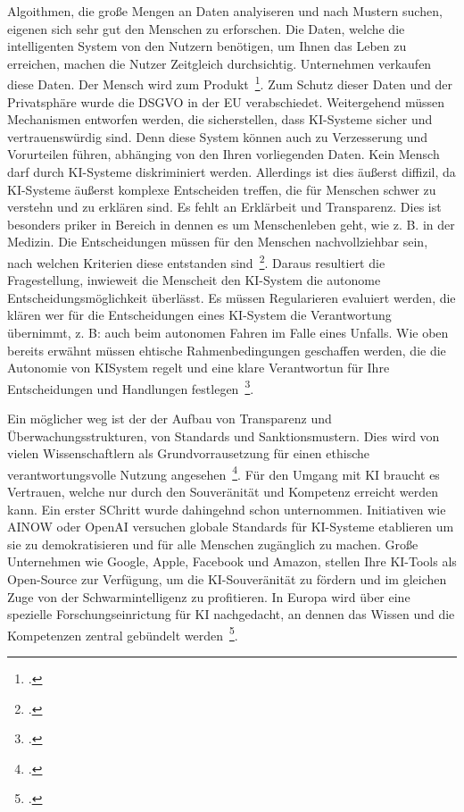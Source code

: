 Algoithmen, die große Mengen an Daten analyiseren und nach Mustern suchen, eigenen sich sehr gut den Menschen zu erforschen. Die Daten, welche die intelligenten System von den 
Nutzern benötigen, um Ihnen das Leben zu erreichen, machen die Nutzer Zeitgleich durchsichtig. Unternehmen verkaufen diese Daten. Der Mensch wird zum Produkt~\footcite[\vglf][]{Lenzen.2020}.
Zum Schutz dieser Daten und der Privatsphäre wurde die \ac{DSGVO} in der \ac{EU} verabschiedet. Weitergehend müssen Mechanismen entworfen werden, die sicherstellen, dass
\ac{KI}-Systeme sicher und vertrauenswürdig sind. 
Denn diese System können auch zu Verzesserung und Vorurteilen führen, abhänging von den Ihren vorliegenden Daten. Kein Mensch darf durch \ac{KI}-Systeme diskriminiert werden.
Allerdings ist dies äußerst diffizil, da \ac{KI}-Systeme äußerst komplexe Entscheiden treffen, die für Menschen schwer zu verstehn und zu erklären sind. Es fehlt an 
Erklärbeit und Transparenz. Dies ist besonders priker in Bereich in dennen es um Menschenleben geht, wie z. B. in der Medizin. Die Entscheidungen müssen für den Menschen 
nachvollziehbar sein, nach welchen Kriterien diese entstanden sind~\footcite[\vglf][]{Wittpahl.2018}.
Daraus resultiert die Fragestellung, inwieweit die Menscheit den \ac{KI}-System die autonome Entscheidungsmöglichkeit überlässt. Es müssen Regularieren evaluiert werden,
die klären wer für die Entscheidungen eines \ac{KI}-System die Verantwortung übernimmt, z. B: auch beim autonomen Fahren im Falle eines Unfalls. Wie oben bereits erwähnt müssen ehtische Rahmenbedingungen geschaffen werden, 
die die Autonomie von \ac{KI}System regelt und eine klare Verantwortun für Ihre Entscheidungen und Handlungen festlegen~\footcite[\vglf][]{Robot.2023}.

Ein möglicher weg ist der der Aufbau von Transparenz und Überwachungsstrukturen, von Standards und Sanktionsmustern. Dies wird von vielen Wissenschaftlern als Grundvorrausetzung
für einen ethische verantwortungsvolle Nutzung angesehen~\footcite[\vglf][]{Wittpahl.2018}. Für den Umgang mit \ac{KI} braucht es Vertrauen, welche nur durch den
Souveränität und Kompetenz erreicht werden kann. Ein erster SChritt wurde dahingehnd schon unternommen. Initiativen wie AINOW oder OpenAI versuchen globale Standards für \ac{KI}-Systeme
etablieren um sie zu demokratisieren und für alle Menschen zugänglich zu machen. Große Unternehmen wie Google, Apple, Facebook und Amazon, stellen Ihre KI-Tools als 
Open-Source zur Verfügung, um die KI-Souveränität zu fördern und im gleichen Zuge von der Schwarmintelligenz zu profitieren. In Europa wird über eine spezielle
Forschungseinrictung für KI nachgedacht, an dennen das Wissen und die Kompetenzen zentral gebündelt werden~\footcite[\vglf][]{Wittpahl.2018}.

